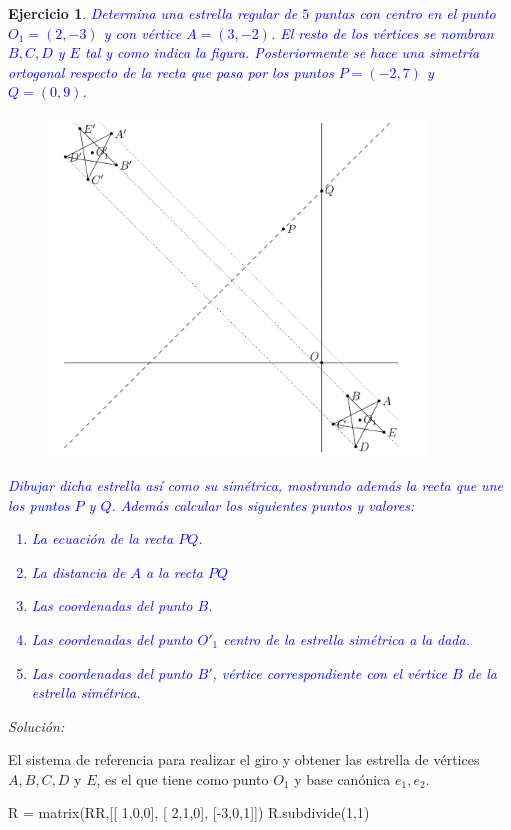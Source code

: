 \documentclass{amsart}
\newtheorem{ejer}{Ejercicio}
\begin{document}
\newpage

\begin{ejer}
\textcolor{blue}{Determina una estrella regular de $5$ puntas con centro en el punto $O_1 = (2,-3)$ y con vértice $A = (3,-2)$. El resto de los vértices se nombran $B, C, D$ y $E$ tal y como indica la figura. Posteriormente se hace una simetría ortogonal respecto de la recta que pasa por los puntos $P = (-2,7)$ y $Q = (0,9)$.}

\begin{figure}[H]
\centering
\includegraphics[width = 10cm]{estrella2.png}
\end{figure}

\textcolor{blue}{Dibujar dicha estrella así como su simétrica, mostrando además la recta que une los puntos $P$ y $Q$. Además calcular los siguientes puntos y valores:
\begin{enumerate} 
\item[a)] La ecuación de la recta $PQ$.
\item[b)] La distancia de $A$ a la recta $PQ$
\item[c)] Las coordenadas del punto $B$.
\item[d)] Las coordenadas del punto $O'_1$ centro de la estrella simétrica a la dada.
\item[e)] Las coordenadas del punto $B'$, vértice correspondiente con el vértice $B$ de la estrella simétrica.
\end{enumerate}}

\end{ejer}

{\it Solución:}

El sistema de referencia para realizar el giro y obtener las estrella de vértices $A, B, C, D$ y $E$, es el que tiene como punto $O_1$ y base canónica $e_1,e_2$.
\begin{sageblock}
R = matrix(RR,[[ 1,0,0],
            [ 2,1,0],
            [-3,0,1]])
R.subdivide(1,1)
\end{sageblock}
\end{document}
